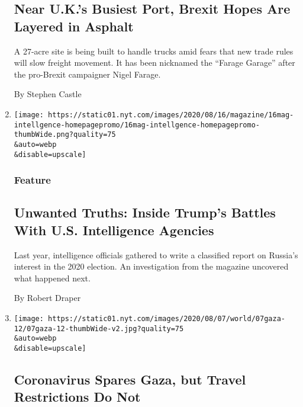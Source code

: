 \begin{enumerate}
  \hypertarget{near-uks-busiest-port-brexit-hopes-are-layered-in-asphalt}{%
  \subsection{Near U.K.'s Busiest Port, Brexit Hopes Are Layered in
  Asphalt}\label{near-uks-busiest-port-brexit-hopes-are-layered-in-asphalt}}

  A 27-acre site is being built to handle trucks amid fears that new
  trade rules will slow freight movement. It has been nicknamed the
  ``Farage Garage'' after the pro-Brexit campaigner Nigel Farage.

  By Stephen Castle
\item
  \href{/2020/08/08/magazine/us-russia-intelligence.html}{}

  \texttt{[image: https://static01.nyt.com/images/2020/08/16/magazine/16mag-intellgence-homepagepromo/16mag-intellgence-homepagepromo-thumbWide.png?quality=75\\\&auto=webp\\\&disable=upscale]}

  \hypertarget{feature}{%
  \subsubsection{Feature}\label{feature}}

  \hypertarget{unwanted-truths-inside-trumps-battles-with-us-intelligence-agencies}{%
  \subsection{Unwanted Truths: Inside Trump's Battles With U.S.
  Intelligence
  Agencies}\label{unwanted-truths-inside-trumps-battles-with-us-intelligence-agencies}}

  Last year, intelligence officials gathered to write a classified
  report on Russia's interest in the 2020 election. An investigation
  from the magazine uncovered what happened next.

  By Robert Draper
\item
  \href{/2020/08/08/world/middleeast/coronavirus-gaza.html}{}

  \texttt{[image: https://static01.nyt.com/images/2020/08/07/world/07gaza-12/07gaza-12-thumbWide-v2.jpg?quality=75\\\&auto=webp\\\&disable=upscale]}

  \hypertarget{coronavirus-spares-gaza-but-travel-restrictions-do-not}{%
  \subsection{Coronavirus Spares Gaza, but Travel Restrictions Do
  Not}\label{coronavirus-spares-gaza-but-travel-restrictions-do-not}}


\end{enumerate}
